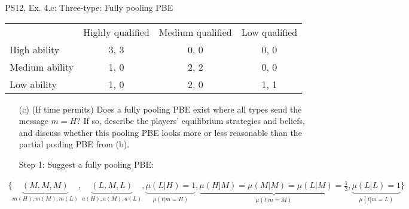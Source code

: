 \begin{frame}{PS12, Ex. 4.c: Three-type: Fully pooling PBE}
    \begin{table}
      \begin{tabular}{l|c|c|c|}
          \multicolumn{1}{c}{} & \multicolumn{1}{c}{Highly qualified} & \multicolumn{1}{c}{Medium qualified} & \multicolumn{1}{c}{Low qualified} \\\cline{2-4}
          High ability   & 3, 3 & 0, 0 & 0, 0 \\\cline{2-4}
          Medium ability & 1, 0 & 2, 2 & 0, 0 \\\cline{2-4}
          Low ability    & 1, 0 & 2, 0 & 1, 1 \\\cline{2-4}
      \end{tabular}
    \end{table}\vspace{-8pt}
    \begin{itemize}
      \item[(c)] (If time permits) Does a fully pooling PBE exist where all types send the message $m = H$? If so, describe the players’ equilibrium strategies and beliefs, and discuss whether this pooling PBE looks more or less reasonable than the partial pooling PBE from (b).
      \item[Step 1:] Suggest a fully pooling PBE:
    \end{itemize}\vspace{-12pt}
    \begin{align*}
      \{\underbrace{(M,M,M)}_{m(H),m(M),m(L)},\underbrace{(L,M,L)}_{a(H),a(M),a(L)},\underbrace{\mu(L|H)=1}_{\mu(t|m=H)},\underbrace{\mu(H|M)=\mu(M|M)=\mu(L|M)=\frac{1}{3}}_{\mu(t|m=M)},\underbrace{\mu(L|L)=1}_{\mu(t|m=L)}\}
    \end{align*}
    \vfill\null
\end{frame}
